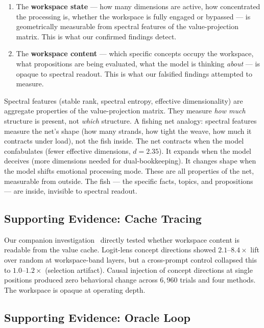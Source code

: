 \documentclass[11pt,a4paper]{article}
\begin{document}
\begin{enumerate}[nosep]
\item The \textbf{workspace state} --- how many dimensions are active,
  how concentrated the processing is, whether the workspace is fully
  engaged or bypassed --- is geometrically measurable from spectral
  features of the value-projection matrix. This is what our confirmed
  findings detect.
\item The \textbf{workspace content} --- which specific concepts occupy
  the workspace, what propositions are being evaluated, what the model
  is thinking \emph{about} --- is opaque to spectral readout. This is
  what our falsified findings attempted to measure.
\end{enumerate}

Spectral features (stable rank, spectral entropy, effective
dimensionality) are aggregate properties of the value-projection
matrix. They measure \emph{how much} structure is present, not
\emph{which} structure. A fishing net analogy: spectral features
measure the net's shape (how many strands, how tight the weave, how
much it contracts under load), not the fish inside. The net contracts
when the model confabulates (fewer effective dimensions, $d{=}2.35$).
It expands when the model deceives (more dimensions needed for
dual-bookkeeping). It changes shape when the model shifts emotional
processing mode. These are all properties of the net, measurable from
outside. The fish --- the specific facts, topics, and propositions ---
are inside, invisible to spectral readout.

\subsection{Supporting Evidence: Cache Tracing}

Our companion investigation~\citep{lyra2026cache_tracing} directly
tested whether workspace content is readable from the value cache.
Logit-lens concept directions showed $2.1$--$8.4\times$ lift over
random at workspace-band layers, but a cross-prompt control collapsed
this to $1.0$--$1.2\times$ (selection artifact). Causal injection of
concept directions at single positions produced zero behavioral change
across $6{,}960$ trials and four methods. The workspace is opaque at
operating depth.

\subsection{Supporting Evidence: Oracle Loop}
\end{document}
